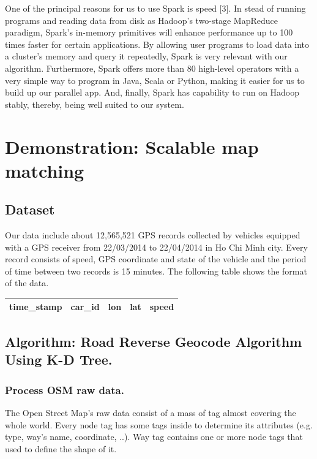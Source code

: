 \documentclass{acm_proc_article-sp}
\begin{document}
\setlength{\parindent}{1cm} One of the principal reasons for us to use Spark is speed [3]. In stead of running programs and reading data from disk as Hadoop’s two-stage MapReduce paradigm, Spark’s in-memory primitives will enhance performance up to 100 times faster for certain applications. By allowing user programs to load data into a cluster's memory and query it repeatedly, Spark is very relevant with our algorithm. Furthermore, Spark offers more than 80 high-level operators with a very simple way to program in Java, Scala or Python, making it easier for us to build up our parallel app. And, finally, Spark has capability to run on Hadoop stably, thereby, being well suited to our system.



\section{Demonstration: Scalable map matching}
\subsection{Dataset}
Our data include about 12,565,521 GPS records collected by vehicles equipped with a GPS receiver from 22/03/2014 to 22/04/2014 in Ho Chi Minh city. Every record consists of speed, GPS coordinate and state of the vehicle and the period of time between two records is 15 minutes. The following table shows the format of the data.

\begin{table}[h]
\centering
\begin{tabular}{|c|c|c|c|c|}
\hline
\textbf{time\_stamp} & \textbf{car\_id} & \textbf{lon}   & \textbf{lat} & \textbf{speed} \\ \hline
\end{tabular}
\end{table}

\subsection{Algorithm: Road Reverse Geocode Algorithm Using K-D Tree.}	
	
\subsubsection{Process OSM raw data.}
	The Open Street Map's raw data consist of a mass of tag almost covering the whole world. Every node tag has some tags inside to determine its attributes (e.g. type, way's name, coordinate, ..). Way tag contains one or more node tags that used to define the shape of it.
	
\end{document}

